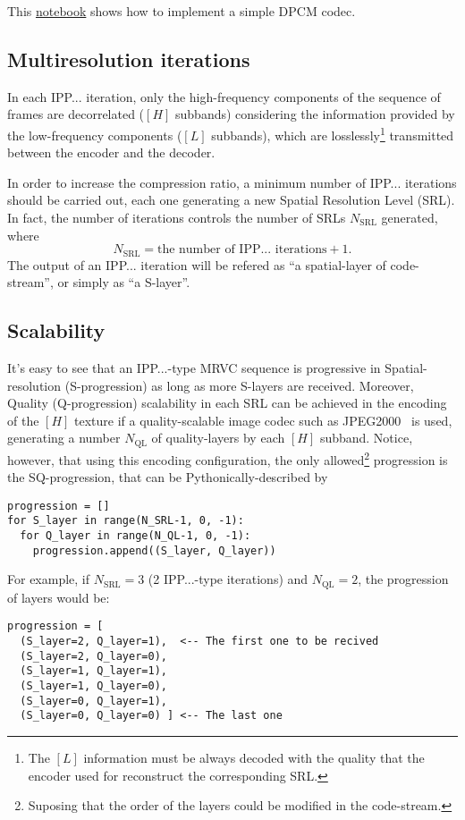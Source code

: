 This
\href{https://github.com/Sistemas-Multimedia/Sistemas-Multimedia.github.io/blob/master/milestones/12-IPP_coding/DPCM.ipynb}{notebook}
shows how to implement a simple DPCM codec.

\subsection{Multiresolution iterations}
In each IPP... iteration, only the high-frequency components of the
sequence of frames are decorrelated ($[H]$ subbands) considering the
information provided by the low-frequency components ($[L]$ subbands),
which are losslessly\footnote{The $[L]$ information must be always
decoded with the quality that the encoder used for reconstruct the
corresponding SRL.} transmitted between the encoder and the decoder.

In order to increase the compression ratio, a minimum number of
IPP... iterations should be carried out, each one generating a new
Spatial Resolution Level (SRL). In fact, the number of iterations
controls the number of SRLs $N_{\text{SRL}}$ generated, where
\begin{equation}
  N_{\text{SRL}} = \text{the number of IPP... iterations} + 1.
\end{equation}
The output of an IPP... iteration will be refered as ``a
spatial-layer of code-stream'', or simply as ``a S-layer''.

\subsection{Scalability}
It's easy to see that an IPP...-type MRVC sequence is progressive in
Spatial-resolution (S-progression) as long as more S-layers are
received. Moreover, Quality (Q-progression) scalability in each SRL
can be achieved in the encoding of the $[H]$ texture if a
quality-scalable image codec such as
JPEG2000~\cite{taubman2002jpeg2000} is used, generating a number
$N_{\text{QL}}$ of quality-layers by each $[H]$ subband. Notice,
however, that using this encoding configuration, the only
allowed\footnote{Suposing that the order of the layers could be
modified in the code-stream.} progression is the SQ-progression, that
can be Pythonically-described by
\begin{verbatim}
progression = []
for S_layer in range(N_SRL-1, 0, -1):
  for Q_layer in range(N_QL-1, 0, -1):
    progression.append((S_layer, Q_layer))
\end{verbatim}

For example, if $N_{\text{SRL}}=3$ (2 IPP...-type iterations) and
$N_{\text{QL}}=2$, the progression of layers would be:
\begin{verbatim}
progression = [
  (S_layer=2, Q_layer=1),  <-- The first one to be recived
  (S_layer=2, Q_layer=0),
  (S_layer=1, Q_layer=1),
  (S_layer=1, Q_layer=0),
  (S_layer=0, Q_layer=1),
  (S_layer=0, Q_layer=0) ] <-- The last one
\end{verbatim}

